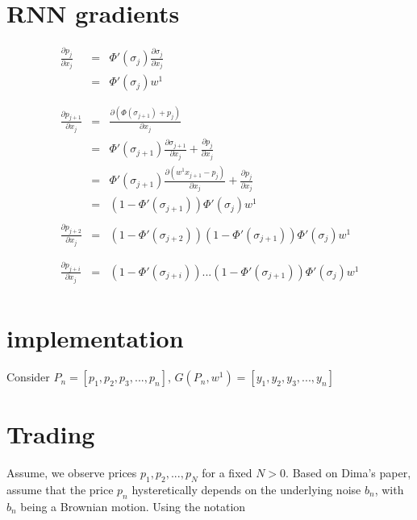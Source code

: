 \documentclass[11pt]{article}
\begin{document}
\section{RNN gradients}
\label{sec:orgdb5b91f}
\begin{eqnarray}
\frac{\partial{p_j}}{\partial x_j} &=& \Phi'(\sigma_j) \frac{\partial \sigma_j}{\partial x_j} \\
&=& \Phi'(\sigma_j) w^{1} \\

\\
\\

\frac{\partial{p_{j+1}}}{\partial x_j} &=& \frac{\partial (\Phi(\sigma_{j+1}) + p_j)}{\partial x_j} \\
&=& \Phi'(\sigma_{j+1}) \frac{\partial \sigma_{j+1}}{\partial x_j} + \frac{\partial p_j}{\partial x_j} \\
&=& \Phi'(\sigma_{j+1}) \frac{\partial (w^{1}x_{j+1} - p_{j})}{\partial x_j} + \frac{\partial p_j}{\partial x_j} \\
&=& (1-\Phi'(\sigma_{j+1})) \Phi'(\sigma_j) w^{1}


\\
\\
\frac{\partial{p_{j+2}}}{\partial x_j} &=&  (1-\Phi'(\sigma_{j+2})) (1-\Phi'(\sigma_{j+1})) \Phi'(\sigma_j) w^{1} \\

\\
\\
\frac{\partial{p_{j+i}}}{\partial x_j} &=&  (1-\Phi'(\sigma_{j+i})) ... (1-\Phi'(\sigma_{j+1})) \Phi'(\sigma_j) w^{1} \\



\end{eqnarray}
\section{implementation}
\label{sec:org91cf35d}

Consider \(P_{n} = [p_{1}, p_{2}, p_{3}, ..., p_{n}]\), \(G(P_{n}, w^{1}) = [y_{1}, y_{2}, y_{3}, ..., y_{n}]\)
\section{Trading}
\label{sec:org8840527}
Assume, we observe prices \(p_1, p_2, ..., p_N\) for a fixed \(N > 0\). Based on Dima's paper,
assume that the price \(p_{n}\) hysteretically depends on the underlying noise \(b_n\), with \(b_n\) being a
Brownian motion. Using the notation
\end{document}
